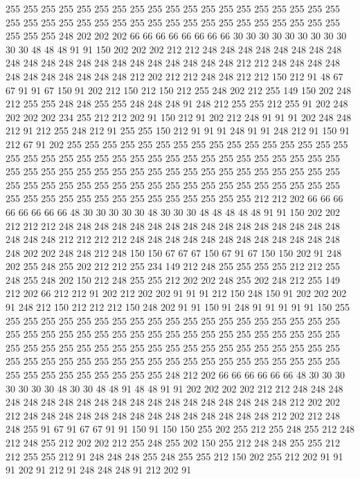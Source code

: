 255 255 255 255 255 255 255 255 255 255 255 255 255 255 255 255 255 255 255 255
255 255 255 255 255 255 255 255 255 255 255 255 255 255 255 255 255 255 255 255
255 248 202 202 202 66 66 66 66 66 66 66 66 30 30 30 30 30 30 30
30 30 30 30 48 48 48 91 91 150 202 202 202 212 212 248 248 248 248 248
248 248 248 248 248 248 248 248 248 248 248 248 248 248 248 248 212 212 248 248
248 248 248 248 248 248 248 248 248 212 202 212 212 248 248 212 212 150 212 91
48 67 67 91 91 67 150 91 202 212 150 212 150 212 255 248 202 212 255 149
150 202 248 212 255 255 248 248 255 255 248 248 248 91 248 212 255 255 212 255
91 202 248 202 202 202 234 255 212 212 202 91 150 212 91 202 212 248 91 91
91 202 248 248 212 91 212 255 248 212 91 255 255 150 212 91 91 91 248 91
91 248 212 91 150 91 212 67 91 202 255 255 255 255 255 255 255 255 255 255
255 255 255 255 255 255 255 255 255 255 255 255 255 255 255 255 255 255 255 255
255 255 255 255 255 255 255 255 255 255 255 255 255 255 255 255 255 255 255 255
255 255 255 255 255 255 255 255 255 255 255 255 255 255 255 255 255 255 255 255
255 255 255 255 255 255 255 255 255 255 255 255 255 255 255 255 255 212 212 202
66 66 66 66 66 66 66 66 48 30 30 30 30 30 48 30 30 30 48 48
48 48 48 91 91 150 202 202 212 212 212 248 248 248 248 248 248 248 248 248
248 248 248 248 248 248 248 248 248 248 212 212 212 212 248 248 248 248 248 248
248 248 248 248 248 248 248 202 202 248 248 212 248 150 150 67 67 67 150 67
91 67 150 150 202 91 248 202 255 248 255 202 212 212 255 234 149 212 248 255
255 255 255 212 212 255 248 255 248 202 150 212 248 255 255 212 202 202 248 255
202 248 212 255 149 212 202 66 212 212 91 202 212 202 202 91 91 91 212 150
248 150 91 202 202 202 91 248 212 150 212 212 212 150 248 202 91 91 150 91
248 91 91 91 91 91 150 255 255 255 255 255 255 255 255 255 255 255 255 255
255 255 255 255 255 255 255 255 255 255 255 255 255 255 255 255 255 255 255 255
255 255 255 255 255 255 255 255 255 255 255 255 255 255 255 255 255 255 255 255
255 255 255 255 255 255 255 255 255 255 255 255 255 255 255 255 255 255 255 255
255 255 255 255 255 255 255 255 255 255 255 255 255 248 212 202 66 66 66 66
66 66 48 30 30 30 30 30 30 30 48 30 30 48 48 91 48 48 91 91
202 202 202 202 212 212 248 248 248 248 248 248 248 248 248 248 248 248 248 248
248 248 248 248 248 212 202 202 212 248 248 248 248 248 248 248 248 248 248 248
248 248 248 212 202 212 248 248 255 91 67 91 67 67 91 91 150 91 150 150
255 202 255 212 255 248 255 212 248 212 248 255 212 202 202 212 255 248 255 202
150 255 212 248 248 255 255 212 212 255 255 212 91 248 248 248 255 248 255 255
212 150 202 255 212 202 91 91 91 202 91 212 91 248 248 248 91 212 202 91

